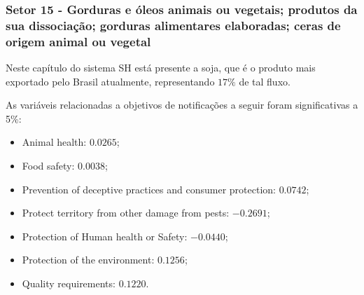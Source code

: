 \subsubsection{Setor 15 - Gorduras e óleos animais ou vegetais; produtos da sua dissociação; gorduras alimentares elaboradas; ceras de origem animal ou vegetal}


 


Neste capítulo do sistema SH está presente a soja, que é o produto mais exportado pelo Brasil atualmente, representando $17\%$ de tal fluxo.

As variáveis relacionadas a objetivos de notificações a seguir foram significativas a 5\%:
\begin{itemize}
    \item Animal health: $0.0265$;
    \item Food safety: $0.0038$;
    \item Prevention of deceptive practices and consumer protection: $0.0742$;
    \item Protect territory from other damage from pests: $-0.2691$;
    \item Protection of Human health or Safety: $-0.0440$;
    \item Protection of the environment: $0.1256$;
    \item Quality requirements: $0.1220$.
\end{itemize}
